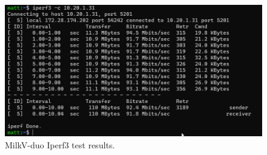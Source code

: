 \begin{figure}[h!]
    \centering
    \includegraphics[width=1\textwidth]{Images/iperf3TestMilkV.png}
    \caption{MilkV-duo Iperf3 test results.}
\end{figure}
